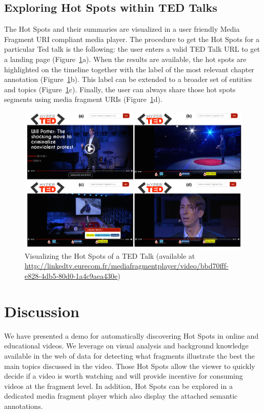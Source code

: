 \documentclass{llncs}
\begin{document}
\subsection{Exploring Hot Spots within TED Talks}
\label{sec:usecase}
The Hot Spots and their summaries are visualized in a user friendly Media Fragment URI compliant media player. The procedure to get the Hot Spots for a particular Ted talk is the following: the user enters a valid TED Talk URL to get a landing page (Figure~\ref{fig:demoScreenShots}a). When the results are available, the hot spots are highlighted on the timeline together with the label of the most relevant chapter annotation (Figure~\ref{fig:demoScreenShots}b). This label can be extended to a broader set of entities and topics (Figure~\ref{fig:demoScreenShots}c). Finally, the user can always share those hot spots segments using media fragment URIs (Figure~\ref{fig:demoScreenShots}d).

\begin{figure}[htbp]
 \centering
 \includegraphics[width=1\textwidth]{figure/Ted_U}
 \caption{Visualizing the Hot Spots of a TED Talk (available at \protect\url{http://linkedtv.eurecom.fr/mediafragmentplayer/video/bbd70fff-e828-4db5-80d0-1a4c9aea430e})}
 \label{fig:demoScreenShots}
\end{figure}


\section{Discussion}
\label{sec:discussion}
We have presented a demo for automatically discovering Hot Spots in online and educational videos. We leverage on visual analysis and background knowledge available in the web of data for detecting what fragments illustrate the best the main topics discussed in the video. Those Hot Spots allow the viewer to quickly decide if a video is worth watching and will provide incentive for consuming videos at the fragment level. In addition, Hot Spots can be explored in a dedicated media fragment player which also display the attached semantic annotations.
\end{document}
